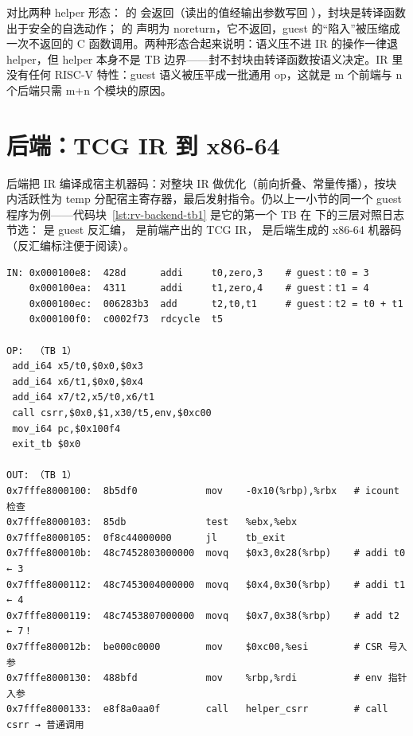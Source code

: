 对比两种 helper 形态： 的  会返回（读出的值经输出参数写回 ），封块是转译函数出于安全的自选动作； 的  声明为 noreturn，它不返回，guest 的“陷入”被压缩成一次不返回的 C 函数调用。两种形态合起来说明：语义压不进 IR 的操作一律退 helper，但 helper 本身不是 TB 边界——封不封块由转译函数按语义决定。IR 里没有任何 RISC-V 特性：guest 语义被压平成一批通用 op，这就是 m 个前端与 n 个后端只需 m+n 个模块的原因。

\section{后端：TCG IR 到 x86-64}\label{sec:software-cpu-backend}

后端把 IR 编译成宿主机器码：对整块 IR 做优化（前向折叠、常量传播），按块内活跃性为 temp 分配宿主寄存器，最后发射指令。仍以上一小节的同一个 guest 程序为例——代码块~\ref{lst:rv-backend-tb1} 是它的第一个 TB 在  下的三层对照日志节选： 是 guest 反汇编， 是前端产出的 TCG IR， 是后端生成的 x86-64 机器码（反汇编标注便于阅读）。

\begin{lstlisting}[caption={TB 1 的三层对照：IN（guest 反汇编）、OP（TCG IR）、OUT（x86-64 机器码，qemu-riscv64 -d in\_asm,op,out\_asm 节选）},label={lst:rv-backend-tb1}]
IN: 0x000100e8:  428d      addi     t0,zero,3    # guest：t0 = 3
    0x000100ea:  4311      addi     t1,zero,4    # guest：t1 = 4
    0x000100ec:  006283b3  add      t2,t0,t1     # guest：t2 = t0 + t1
    0x000100f0:  c0002f73  rdcycle  t5

OP:  （TB 1）
 add_i64 x5/t0,$0x0,$0x3
 add_i64 x6/t1,$0x0,$0x4
 add_i64 x7/t2,x5/t0,x6/t1
 call csrr,$0x0,$1,x30/t5,env,$0xc00
 mov_i64 pc,$0x100f4
 exit_tb $0x0

OUT: （TB 1）
0x7fffe8000100:  8b5df0            mov    -0x10(%rbp),%rbx   # icount 检查
0x7fffe8000103:  85db              test   %ebx,%ebx
0x7fffe8000105:  0f8c44000000      jl     tb_exit
0x7fffe800010b:  48c7452803000000  movq   $0x3,0x28(%rbp)    # addi t0 ← 3
0x7fffe8000112:  48c7453004000000  movq   $0x4,0x30(%rbp)    # addi t1 ← 4
0x7fffe8000119:  48c7453807000000  movq   $0x7,0x38(%rbp)    # add t2 ← 7！
0x7fffe800012b:  be000c0000        mov    $0xc00,%esi        # CSR 号入参
0x7fffe8000130:  488bfd            mov    %rbp,%rdi          # env 指针入参
0x7fffe8000133:  e8f8a0aa0f        call   helper_csrr        # call csrr → 普通调用
\end{lstlisting}

